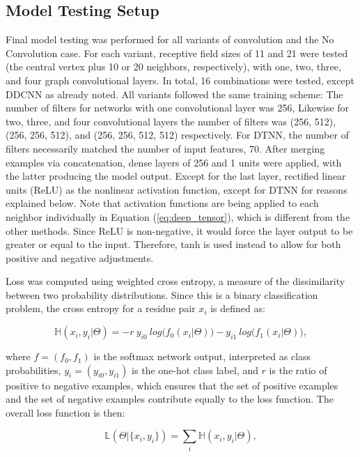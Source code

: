 \subsection{Model Testing Setup}

Final model testing was performed for all variants of convolution and the No Convolution case.
For each variant, receptive field sizes of 11 and 21 were tested (the central vertex plus 10 or 20 neighbors, respectively), with one, two, three, and four graph convolutional layers. 
In total, 16 combinations were tested, except DDCNN as already noted.
All variants followed the same training scheme:
The number of filters for networks with one convolutional layer was 256, Likewise for two, three, and four convolutional layers the number of filters was (256, 512), (256, 256, 512), and (256, 256, 512, 512) respectively.
For DTNN, the number of filters necessarily matched the number of input features, 70.
After merging examples via concatenation, dense layers of 256 and 1 units were applied, with the latter producing the model output.
Except for the last layer, rectified linear units (ReLU) as the nonlinear activation function, except for DTNN for reasons explained below.
Note that activation functions are being applied to each neighbor individually in Equation (\ref{eq:deep_tensor}), which is different from the other methods.
Since ReLU is non-negative, it would force the layer output to be greater or equal to the input.
Therefore, tanh is used instead to allow for both positive and negative adjustments.

Loss was computed using weighted cross entropy, a measure of the dissimilarity between two probability distributions.
Since this is a binary classification problem, the cross entropy for a residue pair $x_i$ is defined as: 

\begin{equation}
\mathbb{H}(x_i, y_i | \Theta) = - r ~ y_{i0} ~ log\big(f_0(x_i|\Theta)\big) - y_{i1} ~ log\big(f_1(x_i|\Theta)\big),
\label{eq:weighted_ce}
\end{equation}

\noindent
where $f = (f_0, f_1)$ is the softmax network output, interpreted as class probabilities, $y_i = (y_{i0}, y_{i1})$ is the one-hot class label, and $r$ is the ratio of positive to negative examples, which ensures that the set of positive examples and the set of negative examples contribute equally to the loss function.
The overall loss function is then:

\begin{equation}
\mathbb{L}(\Theta | \{x_i, y_i\}) = \sum_{i} \mathbb{H}(x_i, y_i | \Theta),
\end{equation}

